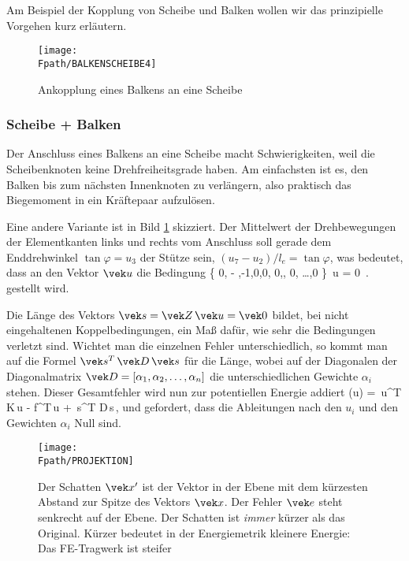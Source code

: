 Am
Beispiel der Kopplung von Scheibe und Balken wollen wir das prinzipielle Vorgehen kurz
erl\"{a}utern.
\begin{figure}[tbp]
\texttt{[image: \\Fpath/BALKENSCHEIBE4]}
\caption{Ankopplung eines Balkens an eine Scheibe} \label{BalkenScheibe4}
\end{figure}%

\subsubsection{Scheibe + Balken} Der Anschluss eines Balkens an eine Scheibe macht Schwierigkeiten, weil die
Scheibenknoten keine Drehfreiheitsgrade haben. Am einfachsten ist es, den Balken bis zum
n\"{a}chsten Innenknoten zu verl\"{a}ngern, also praktisch das Biegemoment in ein Kr\"{a}ftepaar
aufzul\"{o}sen.

Eine andere Variante ist in Bild \ref{BalkenScheibe4} skizziert. Der Mittelwert der
Drehbewegungen der Elementkanten links und rechts vom Anschluss soll gerade dem
Enddrehwinkel $\tan \varphi = u_3$ der St\"{u}tze sein, $(u_7 - u_2)/l_e = \tan \varphi$,
was bedeutet, dass an den Vektor $\vek u$ die Bedingung
\bfoo
\{ 0, - ,-1,0,0, 0,, 0, \ldots,0 \} \,\vek u = 0 \,.
\efoo
gestellt wird.

Die L\"{a}nge des Vektors $\vek s = \vek Z\,\vek u = \vek 0$ bildet, bei nicht eingehaltenen
Koppelbedingungen, ein Ma{\ss} daf\"{u}r, wie sehr die Bedingungen verletzt sind. Wichtet man
die einzelnen Fehler unterschiedlich, so kommt man auf die Formel $\vek s^T\,\vek
D\,\vek s$ f\"{u}r die L\"{a}nge, wobei auf der Diagonalen der Diagonalmatrix $\vek D =
[\alpha_1,\alpha_2,\ldots,\alpha_n]$ die unterschiedlichen Gewichte $\alpha_i$ stehen.
Dieser Gesamtfehler wird nun zur potentiellen Energie addiert
\bfoo
\Pi(\vek u) = \,\vek u^T\,\vek K\,\vek u - \vek f^T\,\vek u +
\,\vek s^T \vek D\,\vek s\,,
\efoo
und gefordert, dass die Ableitungen nach den $u_i$ und den Gewichten $\alpha_i$ Null
sind.

\begin{figure}[tbp]
\if {} \sidecaption \fi
\texttt{[image: \\Fpath/PROJEKTION]}
\caption{Der Schatten $\vek x'$ ist der Vektor in der Ebene mit dem k\"{u}rzesten Abstand
zur Spitze des Vektors $\vek x$. Der Fehler $\vek e$ steht senkrecht auf der Ebene. Der
Schatten ist {\em immer\/} k\"{u}rzer als das Original. K\"{u}rzer bedeutet in der Energiemetrik
kleinere Energie: Das FE-Tragwerk ist steifer} \label{Projektion1}
\end{figure}%

